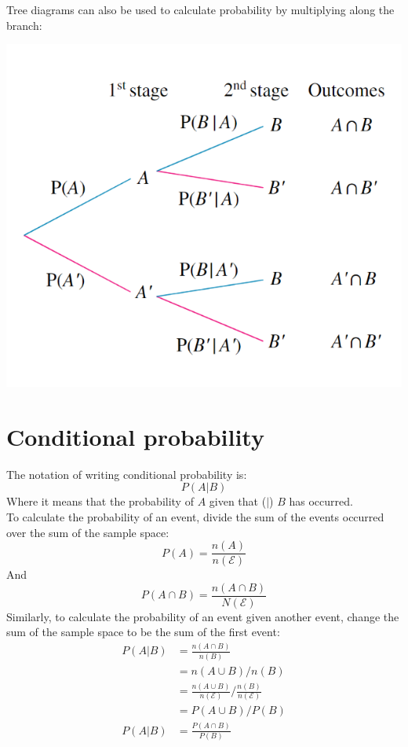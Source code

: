 \documentclass{book}
\begin{document}
Tree diagrams can also be used to calculate probability by multiplying along the branch:
\begin{center}
	\includegraphics[scale=0.5]{tree diagrams probability}
\end{center}

\section{Conditional probability}
The notation of writing conditional probability is:
\[
	P(A|B)
\]
Where it means that the probability of $A$ given that ($|$) $B$ has occurred.\\

To calculate the probability of an event, divide the sum of the events occurred over the sum of the sample space:
\[
	P(A) = \frac{n(A)}{n(\mathcal{E})}
\]
And
\[
	P(A \cap B) = \frac{n(A \cap B)}{N(\mathcal{E})}
\]
Similarly, to calculate the probability of an event given another event, change the sum of the sample space to be the sum of the first event:
\begin{align*}
	P(A|B) & = \frac{n(A \cap B)}{n(B)}                                         \\
	       & = n(A \cup B) / n(B)                                               \\
	       & = \frac{n(A \cup B)}{n(\mathcal{E})} / \frac{n(B)}{n(\mathcal{E})} \\
	       & = P(A \cup B) / P(B)                                               \\
	P(A|B) & = \frac{P(A \cap B)}{P(B)}
\end{align*}
\end{document}
